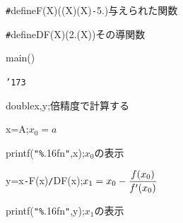 \documentclass{article}
\begin{document}
\noindent
\mbox{}{\tt\#}define{\tt\mc {}\charwd}F(X){\tt\mc {}\charwd}((X){\tt *}(X){\tt -}5.){\tt\mc {}\charwd}{\tt\mc {}\charwd}\rm\mc {\tt /}{\tt *}\charwd 与えられた関数\charwd  \hfill \rm\mc {}\charwd {\tt *}{\tt /}
\tt\mc 

\noindent
\mbox{}{\tt\#}define{\tt\mc {}\charwd}DF(X){\tt\mc {}\charwd}(2.{\tt *}(X)){\tt\mc {}\charwd}{\tt\mc {}\charwd}{\tt\mc {}\charwd}\rm\mc {\tt /}{\tt *}\charwd その導関数\charwd  \hfill \rm\mc {}\charwd {\tt *}{\tt /}
\tt\mc 

\noindent
\mbox{}\hfill

\noindent
\mbox{}main()

\noindent
\mbox{}{\tt\char'173}

\noindent
\mbox{}{\tt\mc {}\charwd}double{\tt\mc {}\charwd}x,{\tt\mc {}\charwd}y;{\tt\mc {}\charwd}{\tt\mc {}\charwd}{\tt\mc {}\charwd}\rm\mc {\tt /}{\tt *}\charwd 倍精度で計算する\charwd  \hfill \rm\mc {}\charwd {\tt *}{\tt /}
\tt\mc 

\noindent
\mbox{}\hfill

\noindent
\mbox{}{\tt\mc {}\charwd}x{\tt\mc {}\charwd}={\tt\mc {}\charwd}A;{\tt\mc {}\charwd}{\tt\mc {}\charwd}{\tt\mc {}\charwd}{\tt\mc {}\charwd}\rm\mc {\tt /}{\tt *}\charwd $\displaystyle x_0=a$\rm\mc {}\charwd  \hfill \rm\mc {}\charwd {\tt *}{\tt /}
\tt\mc 

\noindent
\mbox{}{\tt\mc {}\charwd}printf({\tt "}{\tt\%}.16f{\tt{}}n{\tt "},{\tt\mc {}\charwd}x);{\tt\mc {}\charwd}{\tt\mc {}\charwd}\rm\mc {\tt /}{\tt *}\charwd $x_0$\rm\mc {}\charwd の表示\charwd  \hfill \rm\mc {}\charwd {\tt *}{\tt /}
\tt\mc 

\noindent
\mbox{}{\tt\mc {}\charwd}y{\tt\mc {}\charwd}={\tt\mc {}\charwd}x{\tt\mc {}\charwd}{\tt -}{\tt\mc {}\charwd}F(x){\tt\mc {}\charwd}{\tt /}{\tt\mc {}\charwd}DF(x);{\tt\mc {}\charwd}{\tt\mc {}\charwd}{\tt\mc {}\charwd}\rm\mc {\tt /}{\tt *}\charwd $\displaystyle
				   	x_1=x_0 - {f(x_0)\over f'(x_0)}$\rm\mc 

\noindent
\mbox{}{\tt\mc {}\charwd}{\tt\mc {}\charwd}{\tt\mc {}\charwd}{\tt\mc {}\charwd}{\tt\mc {}\charwd} \hfill \rm\mc {}\charwd {\tt *}{\tt /}
\tt\mc 

\noindent
\mbox{}{\tt\mc {}\charwd}printf({\tt "}{\tt\%}.16f{\tt{}}n{\tt "},{\tt\mc {}\charwd}y);{\tt\mc {}\charwd}{\tt\mc {}\charwd}\rm\mc {\tt /}{\tt *}\charwd $x_1$\rm\mc {}\charwd の表示\charwd  \hfill \rm\mc {}\charwd {\tt *}{\tt /}
\tt\mc 
\end{document}
